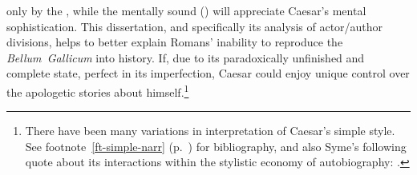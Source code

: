 \documentclass[12pt,letterpaper,oneside,final]{memoir}
\begin{document}
only by the , while the mentally sound () will appreciate Caesar's mental sophistication. This dissertation, and specifically its analysis of actor/author divisions, helps to better explain Romans' inability to reproduce the \emph{Bellum~Gallicum} into history. If, due to its paradoxically unfinished and complete state, perfect in its imperfection, Caesar could enjoy unique control over the apologetic stories about himself.\footnote{There have been many variations in interpretation of Caesar's simple style. See footnote~\ref{ft-simple-narr} (p.~\pageref{ft-simple-narr}) for bibliography, and also Syme's following quote about its interactions within the stylistic economy of autobiography:  \parencite[459--460]{syme1939}.} 
\end{document}
